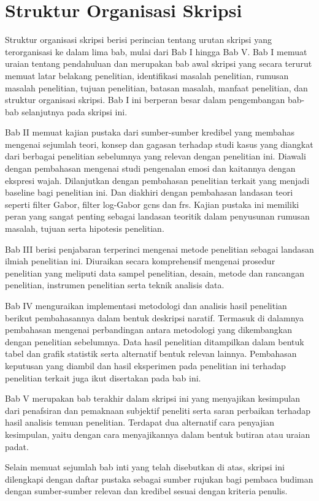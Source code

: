 \section{Struktur Organisasi Skripsi}
Struktur organisasi skripsi berisi perincian tentang urutan skripsi yang terorganisasi ke dalam lima bab, mulai dari Bab I hingga Bab V. Bab I memuat uraian tentang pendahuluan dan merupakan bab awal skripsi yang secara terurut memuat latar belakang penelitian, identifikasi masalah penelitian, rumusan masalah penelitian, tujuan penelitian, batasan masalah, manfaat penelitian, dan struktur organisasi skripsi. Bab I ini berperan besar dalam pengembangan bab-bab selanjutnya pada skripsi ini.

Bab II memuat kajian pustaka dari sumber-sumber kredibel yang membahas mengenai sejumlah teori, konsep dan gagasan terhadap studi kasus yang diangkat dari berbagai penelitian sebelumnya yang relevan dengan penelitian ini. Diawali dengan pembahasan mengenai studi pengenalan emosi dan kaitannya dengan ekspresi wajah. Dilanjutkan dengan pembahasan penelitian terkait yang menjadi baseline bagi penelitian ini. Dan diakhiri dengan pembahasan landasan teori seperti filter Gabor, filter log-Gabor \acrshort{gcns} dan \acrshort{frs}. Kajian pustaka ini memiliki peran yang sangat penting sebagai landasan teoritik dalam penyusunan rumusan masalah, tujuan serta hipotesis penelitian.

Bab III berisi penjabaran terperinci mengenai metode penelitian sebagai landasan ilmiah penelitian ini. Diuraikan secara komprehensif mengenai prosedur penelitian yang meliputi data sampel penelitian, desain, metode dan rancangan penelitian, instrumen penelitian serta teknik analisis data.

Bab IV menguraikan implementasi metodologi dan analisis hasil penelitian berikut pembahasannya dalam bentuk deskripsi naratif. Termasuk di dalamnya pembahasan mengenai perbandingan antara metodologi yang dikembangkan dengan penelitian sebelumnya. Data hasil penelitian ditampilkan dalam bentuk tabel dan grafik statistik serta alternatif bentuk relevan lainnya. Pembahasan keputusan yang diambil dan hasil eksperimen pada penelitian ini terhadap penelitian terkait juga ikut disertakan pada bab ini.

Bab V merupakan bab terakhir dalam skripsi ini yang menyajikan kesimpulan dari penafsiran dan pemaknaan subjektif peneliti serta saran perbaikan terhadap hasil analisis temuan penelitian. Terdapat dua alternatif cara penyajian kesimpulan, yaitu dengan cara menyajikannya dalam bentuk butiran atau uraian padat.

Selain memuat sejumlah bab inti yang telah disebutkan di atas, skripsi ini dilengkapi dengan daftar pustaka sebagai sumber rujukan bagi pembaca budiman dengan sumber-sumber relevan dan kredibel sesuai dengan kriteria penulis. %
